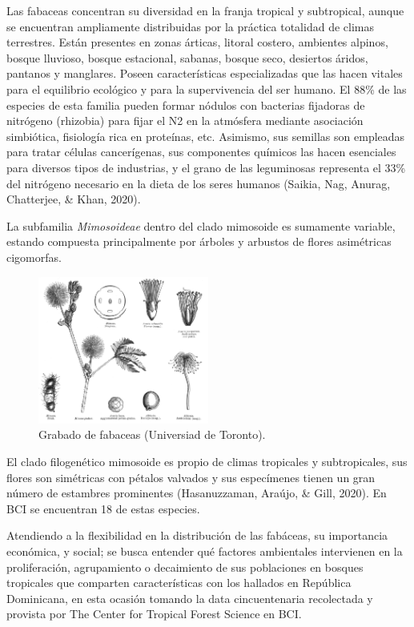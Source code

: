 \documentclass[11pt,]{article}
\begin{document}
Las fabaceas concentran su diversidad en la franja tropical y
subtropical, aunque se encuentran ampliamente distribuidas por la
práctica totalidad de climas terrestres. Están presentes en zonas
árticas, litoral costero, ambientes alpinos, bosque lluvioso, bosque
estacional, sabanas, bosque seco, desiertos áridos, pantanos y
manglares. Poseen características especializadas que las hacen vitales
para el equilibrio ecológico y para la supervivencia del ser humano. El
88\% de las especies de esta familia pueden formar nódulos con bacterias
fijadoras de nitrógeno (rhizobia) para fijar el N2 en la atmósfera
mediante asociación simbiótica, fisiología rica en proteínas, etc.
Asimismo, sus semillas son empleadas para tratar células cancerígenas,
sus componentes químicos las hacen esenciales para diversos tipos de
industrias, y el grano de las leguminosas representa el 33\% del
nitrógeno necesario en la dieta de los seres humanos (Saikia, Nag,
Anurag, Chatterjee, \& Khan, 2020).

La subfamilia \emph{Mimosoideae} dentro del clado mimosoide es sumamente
variable, estando compuesta principalmente por árboles y arbustos de
flores asimétricas cigomorfas.

\begin{figure}
\centering
\includegraphics[width=0.50000\textwidth]{Grabado-Mimosoideae.png}
\caption{Grabado de fabaceas (Universiad de Toronto).}
\end{figure}

El clado filogenético mimosoide es propio de climas tropicales y
subtropicales, sus flores son simétricas con pétalos valvados y sus
especímenes tienen un gran número de estambres prominentes
(Hasanuzzaman, Araújo, \& Gill, 2020). En BCI se encuentran 18 de estas
especies.

Atendiendo a la flexibilidad en la distribución de las fabáceas, su
importancia económica, y social; se busca entender qué factores
ambientales intervienen en la proliferación, agrupamiento o decaimiento
de sus poblaciones en bosques tropicales que comparten características
con los hallados en República Dominicana, en esta ocasión tomando la
data cincuentenaria recolectada y provista por The Center for Tropical
Forest Science en BCI.
\end{document}
